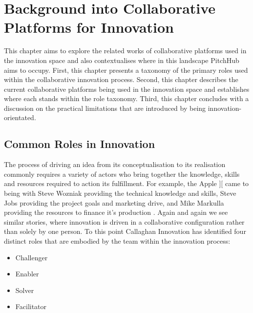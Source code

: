 \chapter{Background into Collaborative Platforms for Innovation}

This chapter aims to explore the related works of collaborative platforms used in the innovation space and also contextualises where in this landscape PitchHub aims to occupy. First, this chapter presents a taxonomy of the primary roles used within the collaborative innovation process. Second, this chapter describes the current collaborative platforms being used in the innovation space and establishes where each stands within the role taxonomy. Third, this chapter concludes with a discussion on the practical limitations that are introduced by being innovation-orientated.

\section{Common Roles in Innovation}

The process of driving an idea from its conceptualisation to its realisation commonly requires a variety of actors who bring together the knowledge, skills and resources required to action its fulfillment. For example, the Apple ][ came to being with Steve Wozniak providing the technical knowledge and skills, Steve Jobs providing the project goals and marketing drive, and Mike Markulla providing the resources to finance it's production \cite{livingston2007founders}. Again and again we see similar stories, where innovation is driven in a collaborative configuration rather than solely by one person. To this point Callaghan Innovation has identified four distinct roles that are embodied by the team within the innovation process:

\begin{itemize}
	\item Challenger
	\item Enabler
	\item Solver
	\item Facilitator
\end{itemize}

